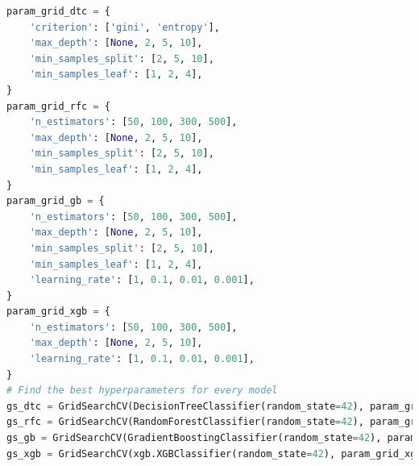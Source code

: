 \documentclass[11pt,a4paper]{article}
\begin{document}
\begin{lstlisting}[language=Python, caption=Using GridSearchCV for best hyperparameters for Classification models]
param_grid_dtc = {
    'criterion': ['gini', 'entropy'],
    'max_depth': [None, 2, 5, 10],
    'min_samples_split': [2, 5, 10],
    'min_samples_leaf': [1, 2, 4],
}
param_grid_rfc = {
    'n_estimators': [50, 100, 300, 500],
    'max_depth': [None, 2, 5, 10],
    'min_samples_split': [2, 5, 10],
    'min_samples_leaf': [1, 2, 4],
}
param_grid_gb = {
    'n_estimators': [50, 100, 300, 500],
    'max_depth': [None, 2, 5, 10],
    'min_samples_split': [2, 5, 10],
    'min_samples_leaf': [1, 2, 4],
    'learning_rate': [1, 0.1, 0.01, 0.001],
}
param_grid_xgb = {
    'n_estimators': [50, 100, 300, 500],
    'max_depth': [None, 2, 5, 10],
    'learning_rate': [1, 0.1, 0.01, 0.001],
}
# Find the best hyperparameters for every model
gs_dtc = GridSearchCV(DecisionTreeClassifier(random_state=42), param_grid_dtc, cv=5, n_jobs=-1, scoring='f1')
gs_rfc = GridSearchCV(RandomForestClassifier(random_state=42), param_grid_rfc, cv=5, n_jobs=-1, scoring='f1')
gs_gb = GridSearchCV(GradientBoostingClassifier(random_state=42), param_grid_gb, cv=5, n_jobs=-1, scoring='f1')
gs_xgb = GridSearchCV(xgb.XGBClassifier(random_state=42), param_grid_xgb, cv=5, n_jobs=-1, scoring='f1')
\end{lstlisting}
\end{document}

